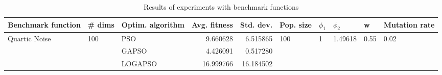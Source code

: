 \begin{table}
\centering
\caption{Results of experiments with benchmark functions}
\begin{tabular}{lllrrlllll}
\toprule
            Benchmark function &              \# dims & Optim. algorithm &  Avg. fitness &  Std. dev. &            Pop. size &         $\phi_{1}$ &               $\phi_{2}$ &                     w &         Mutation rate \\
\midrule
\multirow{3}{*}{Quartic Noise} & \multirow{3}{*}{100} &              PSO &      9.660628 &   6.515865 & \multirow{3}{*}{100} & \multirow{3}{*}{1} & \multirow{3}{*}{1.49618} & \multirow{3}{*}{0.55} & \multirow{3}{*}{0.02} \\
                               &                      &            GAPSO &      4.426091 &   0.517280 &                      &                    &                          &                       &                       \\
                               &                      &          LOGAPSO &     16.999766 &  16.184502 &                      &                    &                          &                       &                       \\
\bottomrule
\end{tabular}
\end{table}
